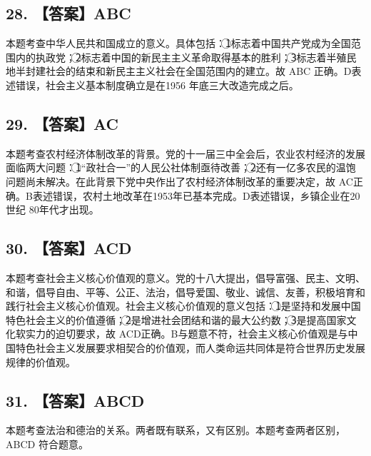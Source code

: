 \documentclass[UTF8,11pt]{ctexart}
\begin{document}
\subsection*{28. 【答案】ABC}

本题考查中华人民共和国成立的意义。具体包括：\textcircled{1}标志着中国共产党成为全国范围内的执政党；\textcircled{2}标志着中国的新民主主义革命取得基本的胜利；\textcircled{3}标志着半殖民地半封建社会的结束和新民主主义社会在全国范围内的建立。故 ABC 正确。D表述错误，社会主义基本制度确立是在1956 年底三大改造完成之后。


\subsection*{29. 【答案】AC}

本题考查农村经济体制改革的背景。党的十一届三中全会后，农业农村经济的发展面临两大问题：\textcircled{1}“政社合一”的人民公社体制亟待改善；\textcircled{2}还有一亿多农民的温饱问题尚未解决。在此背景下党中央作出了农村经济体制改革的重要决定，故 AC正确。B表述错误，农村土地改革在1953年已基本完成。D表述错误，乡镇企业在20世纪 80年代才出现。


\subsection*{30. 【答案】ACD}

本题考查社会主义核心价值观的意义。党的十八大提出，倡导富强、民主、文明、和谐，倡导自由、平等、公正、法治，倡导爱国、敬业、诚信、友善，积极培育和践行社会主义核心价值观。社会主义核心价值观的意义包括：\textcircled{1}是坚持和发展中国特色社会主义的价值遵循；\textcircled{2}是增进社会团结和谐的最大公约数；\textcircled{3}是提高国家文化软实力的迫切要求，故 ACD正确。B与题意不符，社会主义核心价值观是与中国特色社会主义发展要求相契合的价值观，而人类命运共同体是符合世界历史发展规律的价值观。


\subsection*{31. 【答案】ABCD}

本题考查法治和德治的关系。两者既有联系，又有区别。本题考查两者区别，ABCD 符合题意。
\end{document}

